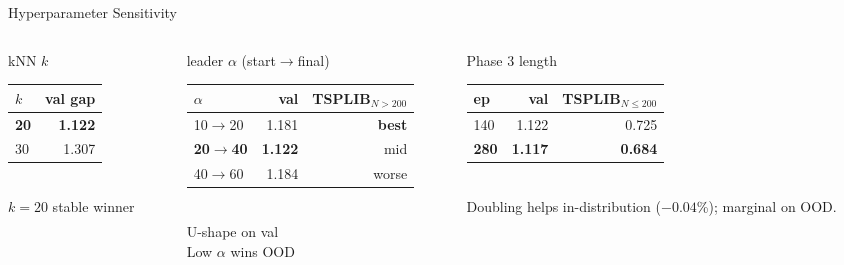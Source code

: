 \documentclass[aspectratio=169,11pt]{beamer}
\begin{document}
\begin{frame}{Hyperparameter Sensitivity}
  \begin{columns}[T,totalwidth=\textwidth]
    \begin{column}{0.33\textwidth}
      \begin{block}{kNN $k$}
        \scriptsize
        \begin{tabularx}{\linewidth}{Xr}
          \toprule
          $k$ & val gap \\
          \midrule
          \textbf{20} & \textbf{1.122} \\
          30          & 1.307 \\
          \bottomrule
        \end{tabularx}
        \\[0.2cm]
        $k=20$ stable winner
      \end{block}
    \end{column}
    \begin{column}{0.33\textwidth}
      \begin{block}{leader $\alpha$ (start$\to$final)}
        \scriptsize
        \begin{tabularx}{\linewidth}{Xrr}
          \toprule
          $\alpha$ & val & TSPLIB$_{N>200}$ \\
          \midrule
          10$\to$20 & 1.181 & \textbf{best} \\
          \textbf{20$\to$40} & \textbf{1.122} & mid \\
          40$\to$60 & 1.184 & worse \\
          \bottomrule
        \end{tabularx}
        \\[0.2cm]
        U-shape on val\\
        Low $\alpha$ wins OOD
      \end{block}
    \end{column}
    \begin{column}{0.33\textwidth}
      \begin{block}{Phase 3 length}
        \scriptsize
        \begin{tabularx}{\linewidth}{Xrr}
          \toprule
          ep & val & TSPLIB$_{N\!\leq\!200}$ \\
          \midrule
          140 & 1.122 & 0.725 \\
          \textbf{280} & \textbf{1.117} & \textbf{0.684} \\
          \bottomrule
        \end{tabularx}
        \\[0.2cm]
        Doubling helps in-distribution
        ($-0.04$\%); marginal on OOD.
      \end{block}
    \end{column}
  \end{columns}


\end{frame}
\end{document}
